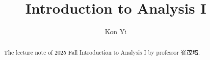 \documentclass[a4paper]{report}
\author{Kon Yi}
\title{Introduction to Analysis I}
\begin{document}
\maketitle

\begin{abstract}
    The lecture note of 2025 Fall Introduction to Analysis I by professor 崔茂培.
\end{abstract}

\newpage

\tableofcontents


\newpage
\appendix
\appendixpage{}



\newpage
\pagestyle{plain}
\printbibliography{}
\end{document}

